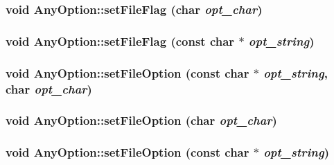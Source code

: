 \label{classAnyOption_a8fa052e644d8b04b7bd95bda48c16cf8}
\hypertarget{classAnyOption_a19dad4072d02832b2d86b20f6c11c117}{
\subsubsection[{setFileFlag}]{\setlength{\rightskip}{0pt plus 5cm}void AnyOption::setFileFlag (char {\em opt\_\-char})}}
\label{classAnyOption_a19dad4072d02832b2d86b20f6c11c117}
\hypertarget{classAnyOption_a58332626754ef69f750f2583f7b72a72}{
\subsubsection[{setFileFlag}]{\setlength{\rightskip}{0pt plus 5cm}void AnyOption::setFileFlag (const char $\ast$ {\em opt\_\-string})}}
\label{classAnyOption_a58332626754ef69f750f2583f7b72a72}
\hypertarget{classAnyOption_a0f0790f91a6bbdba445e8d613c4b1e2d}{
\subsubsection[{setFileOption}]{\setlength{\rightskip}{0pt plus 5cm}void AnyOption::setFileOption (const char $\ast$ {\em opt\_\-string}, \/  char {\em opt\_\-char})}}
\label{classAnyOption_a0f0790f91a6bbdba445e8d613c4b1e2d}
\hypertarget{classAnyOption_a700d49a1544d37247d9a29bf89f7602b}{
\subsubsection[{setFileOption}]{\setlength{\rightskip}{0pt plus 5cm}void AnyOption::setFileOption (char {\em opt\_\-char})}}
\label{classAnyOption_a700d49a1544d37247d9a29bf89f7602b}
\hypertarget{classAnyOption_a4eeaaf6a433ae7d0724243581436914b}{
\subsubsection[{setFileOption}]{\setlength{\rightskip}{0pt plus 5cm}void AnyOption::setFileOption (const char $\ast$ {\em opt\_\-string})}}
